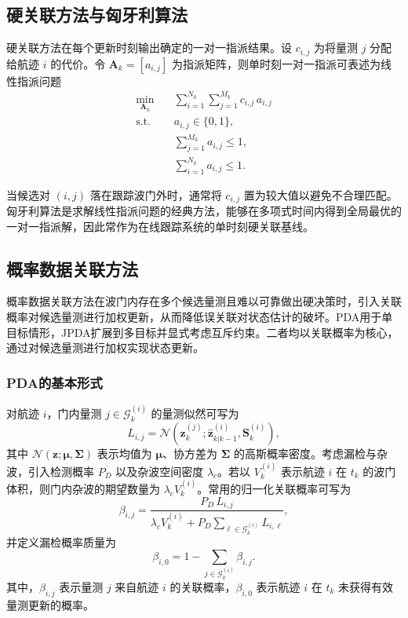 \documentclass{xdupgthesis}
\begin{document}
\subsection{硬关联方法与匈牙利算法}

硬关联方法在每个更新时刻输出确定的一对一指派结果。设 $c_{i,j}$ 为将量测 $j$ 分配给航迹 $i$ 的代价。令 $\mathbf{A}_k=[a_{i,j}]$ 为指派矩阵，则单时刻一对一指派可表述为线性指派问题
\begin{align}
	\min_{\mathbf{A}_k}\quad 
	& \sum_{i=1}^{N_k}\sum_{j=1}^{M_k} c_{i,j}\,a_{i,j} \\
	\text{s.t.}\quad
	& a_{i,j}\in\{0,1\}, \\
	& \sum_{j=1}^{M_k} a_{i,j}\le 1, \\
	& \sum_{i=1}^{N_k} a_{i,j}\le 1 .
\end{align}

当候选对 $(i,j)$ 落在跟踪波门外时，通常将 $c_{i,j}$ 置为较大值以避免不合理匹配。匈牙利算法是求解线性指派问题的经典方法，能够在多项式时间内得到全局最优的一对一指派解，因此常作为在线跟踪系统的单时刻硬关联基线。

\subsection{概率数据关联方法}

概率数据关联方法在波门内存在多个候选量测且难以可靠做出硬决策时，引入关联概率对候选量测进行加权更新，从而降低误关联对状态估计的破坏。PDA用于单目标情形，JPDA扩展到多目标并显式考虑互斥约束。二者均以关联概率为核心，通过对候选量测进行加权实现状态更新。


\subsubsection{PDA的基本形式}

对航迹 $i$，门内量测 $j\in\mathcal{G}^{(i)}_k$ 的量测似然可写为
\begin{equation}
	L_{i,j}
	=
	\mathcal{N}\!\left(
	\mathbf{z}^{(j)}_k;
	\hat{\mathbf{z}}^{(i)}_{k|k-1},
	\mathbf{S}^{(i)}_k
	\right),
\end{equation}
其中 $\mathcal{N}(\mathbf{z};\boldsymbol{\mu},\mathbf{\Sigma})$ 表示均值为 $\boldsymbol{\mu}$、协方差为 $\mathbf{\Sigma}$ 的高斯概率密度。考虑漏检与杂波，引入检测概率 $P_D$ 以及杂波空间密度 $\lambda_c$。若以 $V_k^{(i)}$ 表示航迹 $i$ 在 $t_k$ 的波门体积，则门内杂波的期望数量为 $\lambda_c V_k^{(i)}$。常用的归一化关联概率可写为
\begin{equation}
	\beta_{i,j}
	=
	\frac{P_D\,L_{i,j}}
	{\lambda_c V_k^{(i)} + P_D\sum\limits_{\ell\in\mathcal{G}^{(i)}_k}L_{i,\ell}},
\end{equation}
并定义漏检概率质量为
\begin{equation}
	\beta_{i,0}
	=
	1-\sum_{j\in\mathcal{G}^{(i)}_k}\beta_{i,j}.
\end{equation}
其中，$\beta_{i,j}$ 表示量测 $j$ 来自航迹 $i$ 的关联概率，$\beta_{i,0}$ 表示航迹 $i$ 在 $t_k$ 未获得有效量测更新的概率。
\end{document}
